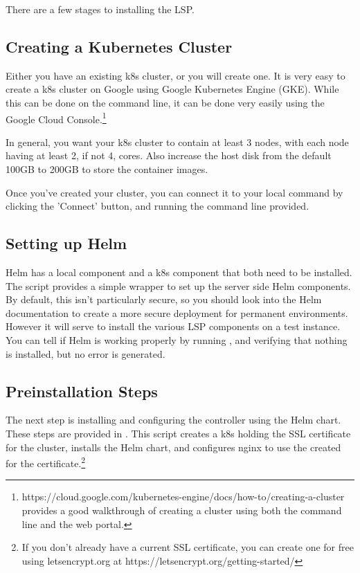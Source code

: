 \documentclass[11pt,twoside]{article}
\begin{document}
There are a few stages to installing the LSP.

\subsection{Creating a Kubernetes Cluster}

Either you have an existing k8s cluster, or you will create one.  It is very
easy to create a k8s cluster on Google using Google Kubernetes Engine (GKE).
While this can be done on the command line, it can be done very easily
using the Google Cloud Console.\footnote{https://cloud.google.com/kubernetes-engine/docs/how-to/creating-a-cluster
provides a good walkthrough of creating a cluster using both the command line
and the web portal.}

In general, you want your k8s cluster to contain at least 3 nodes, with each node
having at least 2, if not 4, cores.  Also increase the host disk from
the default 100GB to 200GB to store the container images.

Once you've created your cluster, you can connect it to your local 
command by clicking the 'Connect' button, and running the command line provided.

\subsection{Setting up Helm}

Helm has a local component and a k8s component that both need to be installed.
The  script provides a simple wrapper to set up the
server side Helm components.
By default, this isn't particularly secure, so you should look into the Helm
documentation to create a more secure deployment for permanent environments.
However it will serve to install the various LSP components on a test instance.
You can tell if Helm is working properly by running , and verifying
that nothing is installed, but no error is generated.

\subsection{Preinstallation Steps}

The next step is installing and configuring the  controller
using the Helm chart.  These steps are provided in .
This script creates a k8s  holding the SSL certificate for the cluster, installs the Helm
chart, and configures nginx to use the created  for the certificate.\footnote{
If you don't already have a current SSL certificate, you can create one for
free using letsencrypt.org at https://letsencrypt.org/getting-started/}
\end{document}
